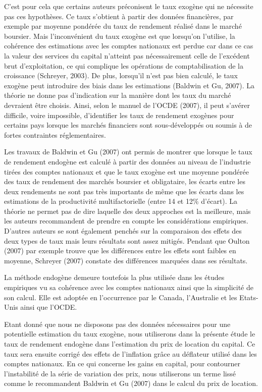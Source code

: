 \documentclass[12pt,a4paper,oneside]{report}
\begin{document}
C’est pour cela que certains auteurs préconisent le taux exogène qui ne nécessite pas ces hypothèses. Ce taux
s’obtient à partir des données financières, par exemple par moyenne pondérée du taux de rendement réalisé dans
le marché boursier. Mais l’inconvénient du taux exogène est que lorsqu’on l’utilise, la cohérence des
estimations avec les comptes nationaux est perdue car dans ce cas la valeur des services du capital n’atteint
pas nécessairement celle de l’excédent brut d’exploitation, ce qui complique les opérations de
comptabilisation de la croissance (Schreyer, 2003). De plus, lorsqu’il n’est pas bien calculé, le taux exogène
peut introduire des biais dans les estimations (Baldwin et Gu, 2007). La théorie ne donne pas d’indication sur
la manière dont les taux du marché devraient être choisis. Ainsi, selon le manuel de l’OCDE (2007), il peut
s’avérer difficile, voire impossible, d’identifier les taux de rendement exogènes pour certains pays lorsque
les marchés financiers sont sous-développés ou soumis à de fortes contraintes réglementaires.

Les travaux de Baldwin et Gu (2007) ont permis de montrer que lorsque le taux de rendement endogène est
calculé à partir des données au niveau de l’industrie tirées des comptes nationaux et que le taux exogène est
une moyenne pondérée des taux de rendement des marchés boursier et obligataire, les écarts entre les deux
rendements ne sont pas très importants de même que les écarts dans les estimations de la productivité
multifactorielle (entre 14 et 12\% d’écart). La théorie ne permet pas de dire laquelle des deux approches est
la meilleure, mais les auteurs recommandent de prendre en compte les considérations empiriques. D’autres
auteurs se sont également penchés sur la comparaison des effets des deux types de taux mais leurs résultats
sont assez mitigés. Pendant que Oulton (2007) par exemple trouve que les différences entre les effets sont
faibles en moyenne, Schreyer (2007) constate des différences marquées dans ses résultats.

La méthode endogène demeure toutefois la plus utilisée dans les études empiriques vu sa cohérence avec les
comptes nationaux ainsi que la simplicité de son calcul. Elle est adoptée en l’occurrence par le Canada,
l’Australie et les Etats-Unis ainsi que l’OCDE.

Etant donné que nous ne disposons pas des données nécessaires pour une potentielle estimation du taux exogène,
nous utiliserons dans la présente étude le taux de rendement endogène dans l’estimation du prix de location du
capital. Ce taux sera ensuite corrigé des effets de l’inflation grâce au déflateur utilisé dans les comptes
nationaux. En ce qui concerne les gains en capital, pour contourner l’instabilité de la série de variation des
prix, nous utiliserons un terme lissé comme le recommandent Baldwin et Gu (2007) dans le calcul du prix de
location.
\end{document}
